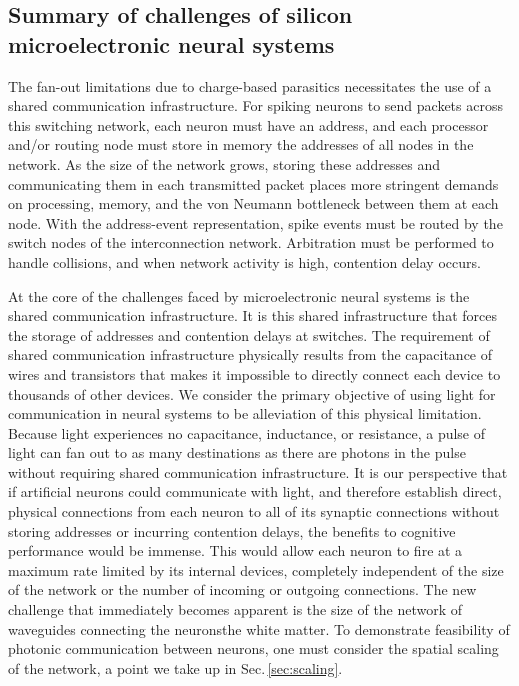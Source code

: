 \documentclass[twocolumn]{article}
\begin{document}
\subsection{Summary of challenges of silicon microelectronic neural systems}
The fan-out limitations due to charge-based parasitics necessitates the use of a shared communication infrastructure. For spiking neurons to send packets across this switching network, each neuron must have an address, and each processor and/or routing node must store in memory the addresses of all nodes in the network. As the size of the network grows, storing these addresses and communicating them in each transmitted packet places more stringent demands on processing, memory, and the von Neumann bottleneck between them at each node. With the address-event representation, spike events must be routed by the switch nodes of the interconnection network. Arbitration must be performed to handle collisions, and when network activity is high, contention delay occurs. 

At the core of the challenges faced by microelectronic neural systems is the shared communication infrastructure. It is this shared infrastructure that forces the storage of addresses and contention delays at switches. The requirement of shared communication infrastructure physically results from the capacitance of wires and transistors that makes it impossible to directly connect each device to thousands of other devices. We consider the primary objective of using light for communication in neural systems to be alleviation of this physical limitation. Because light experiences no capacitance, inductance, or resistance, a pulse of light can fan out to as many destinations as there are photons in the pulse without requiring shared communication infrastructure. It is our perspective that if artificial neurons could communicate with light, and therefore establish direct, physical connections from each neuron to all of its synaptic connections without storing addresses or incurring contention delays, the benefits to cognitive performance would be immense. This would allow each neuron to fire at a maximum rate limited by its internal devices, completely independent of the size of the network or the number of incoming or outgoing connections. The new challenge that immediately becomes apparent is the size of the network of waveguides connecting the neurons\textemdash the white matter. To demonstrate feasibility of photonic communication between neurons, one must consider the spatial scaling of the network, a point we take up in Sec.\,\ref{sec:scaling}.
\end{document}
